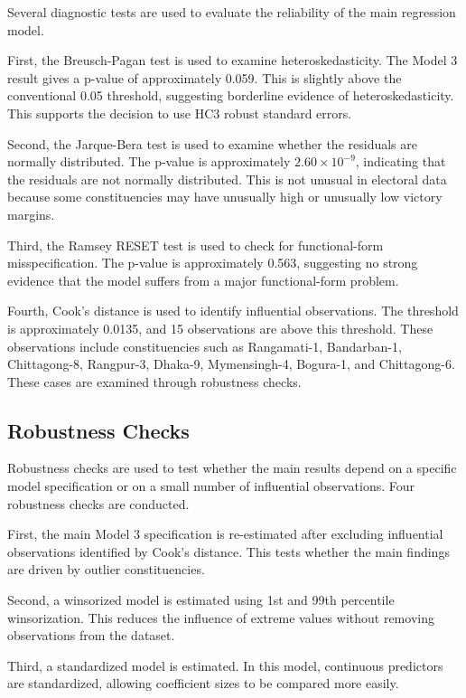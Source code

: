 \documentclass[12pt,a4paper]{article}
\begin{document}
Several diagnostic tests are used to evaluate the reliability of the main regression model.

First, the Breusch-Pagan test is used to examine heteroskedasticity. The Model 3 result gives a p-value of approximately 0.059. This is slightly above the conventional 0.05 threshold, suggesting borderline evidence of heteroskedasticity. This supports the decision to use HC3 robust standard errors.

Second, the Jarque-Bera test is used to examine whether the residuals are normally distributed. The p-value is approximately \(2.60 \times 10^{-9}\), indicating that the residuals are not normally distributed. This is not unusual in electoral data because some constituencies may have unusually high or unusually low victory margins.

Third, the Ramsey RESET test is used to check for functional-form misspecification. The p-value is approximately 0.563, suggesting no strong evidence that the model suffers from a major functional-form problem.

Fourth, Cook's distance is used to identify influential observations. The threshold is approximately 0.0135, and 15 observations are above this threshold. These observations include constituencies such as Rangamati-1, Bandarban-1, Chittagong-8, Rangpur-3, Dhaka-9, Mymensingh-4, Bogura-1, and Chittagong-6. These cases are examined through robustness checks.

\subsection{Robustness Checks}

Robustness checks are used to test whether the main results depend on a specific model specification or on a small number of influential observations. Four robustness checks are conducted.

First, the main Model 3 specification is re-estimated after excluding influential observations identified by Cook's distance. This tests whether the main findings are driven by outlier constituencies.

Second, a winsorized model is estimated using 1st and 99th percentile winsorization. This reduces the influence of extreme values without removing observations from the dataset.

Third, a standardized model is estimated. In this model, continuous predictors are standardized, allowing coefficient sizes to be compared more easily.
\end{document}
